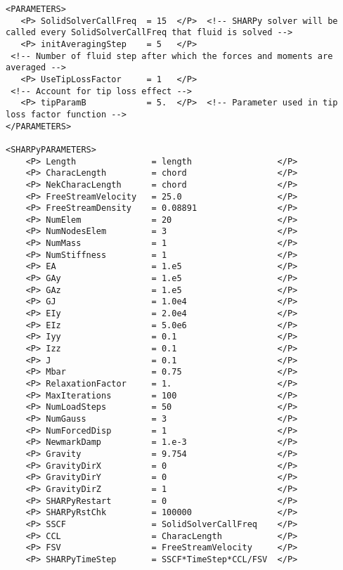 \begin{lstlisting}[style=XMLStyle]
<PARAMETERS>
   <P> SolidSolverCallFreq  = 15  </P>  <!-- SHARPy solver will be called every SolidSolverCallFreq that fluid is solved -->
   <P> initAveragingStep    = 5   </P>
 <!-- Number of fluid step after which the forces and moments are averaged -->
   <P> UseTipLossFactor     = 1   </P>
 <!-- Account for tip loss effect -->
   <P> tipParamB            = 5.  </P>  <!-- Parameter used in tip loss factor function -->
</PARAMETERS>

<SHARPyPARAMETERS>
    <P> Length               = length         	      </P>
    <P> CharacLength         = chord                  </P>
    <P> NekCharacLength      = chord                  </P>
    <P> FreeStreamVelocity   = 25.0                   </P>
    <P> FreeStreamDensity    = 0.08891                </P>
    <P> NumElem              = 20                     </P>
    <P> NumNodesElem         = 3                      </P>
    <P> NumMass              = 1                      </P>
    <P> NumStiffness         = 1                      </P>
    <P> EA                   = 1.e5                   </P> 
    <P> GAy                  = 1.e5                   </P>
    <P> GAz                  = 1.e5                   </P>
    <P> GJ                   = 1.0e4                  </P> 
    <P> EIy                  = 2.0e4                  </P>
    <P> EIz                  = 5.0e6                  </P>
    <P> Iyy                  = 0.1                    </P> 
    <P> Izz                  = 0.1                    </P> 
    <P> J                    = 0.1                    </P> 
    <P> Mbar                 = 0.75                   </P> 
    <P> RelaxationFactor     = 1.                     </P>
    <P> MaxIterations        = 100           	      </P>
    <P> NumLoadSteps         = 50		              </P> 
    <P> NumGauss             = 3             	      </P>
    <P> NumForcedDisp        = 1                      </P>
    <P> NewmarkDamp          = 1.e-3                  </P>
    <P> Gravity              = 9.754                  </P>
    <P> GravityDirX          = 0              	      </P>
    <P> GravityDirY          = 0              	      </P>
    <P> GravityDirZ          = 1              	      </P>
    <P> SHARPyRestart        = 0              	      </P>
    <P> SHARPyRstChk         = 100000              	  </P>
    <P> SSCF                 = SolidSolverCallFreq    </P>
    <P> CCL                  = CharacLength           </P>
    <P> FSV                  = FreeStreamVelocity     </P>
    <P> SHARPyTimeStep       = SSCF*TimeStep*CCL/FSV  </P>


\end{lstlisting}

